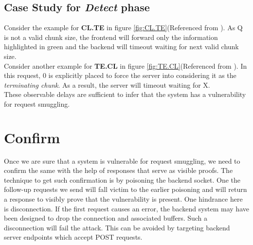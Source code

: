 \subsection{Case Study for \textit{Detect} phase}
Consider the example for \textbf{CL.TE} in figure \ref{fig:CL.TE}(Referenced from \cite{b6}). As \textcolor{myred}{Q} is not a valid chunk size, the frontend will forward only the information highlighted in \textcolor{mygreen}{green} and the backend will timeout waiting for next valid chunk size. \\
Consider another example for \textbf{TE.CL} in figure \ref{fig:TE.CL}(Referenced from \cite{b6}). In this request, \textcolor{mygreen}{0} is explicitly placed to force the server into considering it as the \textit{terminating chunk}. As a result, the server will timeout waiting for \textcolor{myred}{X}.\\
These observable delays are sufficient to infer that the system has a vulnerability for request smuggling.\\

\section{Confirm}
Once we are sure that a system is vulnerable for request smuggling, we need to confirm the same with the help of responses that serve as visible proofs. The technique to get such confirmation is by poisoning the backend socket. One the follow-up requests we send will fall victim to the earlier poisoning and will return a response to visibly prove that the vulnerability is present. One hindrance here is disconnection. If the first request causes an error, the backend system may have been designed to drop the connection and associated buffers. Such a disconnection will fail the attack. This can be avoided by targeting backend server endpoints which accept POST requests. 

